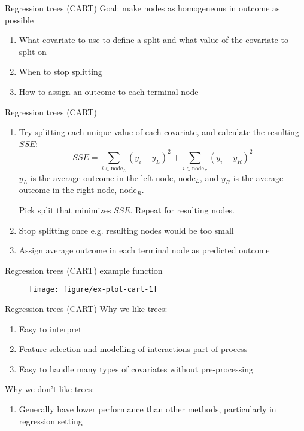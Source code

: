 \documentclass[handout]{beamer}
\begin{document}
\begin{frame}{Regression trees (CART)}
  Goal: make nodes as homogeneous in outcome as possible
  \begin{enumerate}
    \item What covariate to use to define a split and what value of the covariate to split on
    \item When to stop splitting
    \item How to assign an outcome to each terminal node
  \end{enumerate}
\end{frame}

\begin{frame}{Regression trees (CART)}
  \begin{enumerate}
    \item Try splitting each unique value of each covariate, and calculate the resulting $SSE$:
  \begin{equation}
    SSE = \sum_{i \in \text{node}_{L}} (y_{i} - \bar{y}_{L})^2 + \sum_{i \in \text{node}_{R}} (y_{i} - \bar{y}_{R})^2
  \end{equation}
  $\bar{y}_{L}$ is the average outcome in the left node, $\text{node}_{L}$, and $\bar{y}_{R}$ is the average outcome in the right node, $\text{node}_{R}$.
  
  Pick split that minimizes $SSE$. Repeat for resulting nodes.
  \item Stop splitting once e.g. resulting nodes would be too small
  \item Assign average outcome in each terminal node as predicted outcome 
  \end{enumerate}
\end{frame}

\begin{frame}{Regression trees (CART) example function}
  \begin{figure}[!htbp]
  \begin{center}
    \texttt{[image: figure/ex-plot-cart-1]}
  \end{center}
  \end{figure}
\end{frame}

\begin{frame}{Regression trees (CART)}
  Why we like trees:
  \begin{enumerate}
    \item Easy to interpret
    \item Feature selection and modelling of interactions part of process
    \item Easy to handle many types of covariates without pre-processing 
  \end{enumerate}
  
  Why we don't like trees:
  \begin{enumerate}
    \item Generally have lower performance than other methods, particularly in regression setting
  \end{enumerate}
\end{frame}
\end{document}
